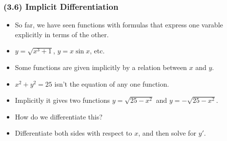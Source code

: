 \begin{frame}
\frametitle{(3.6) Implicit Differentiation}
\begin{itemize}
\item  So far, we have seen functions with formulas that express one varable explicitly in terms of the other.
\item<2->  $y = \sqrt{x^3+1}$, $y = x\sin x$, etc.
\item<3->  Some functions are given implicitly by a relation between $x$ and $y$.
\item<4->  $x^2 + y^2 = 25$ isn't the equation of any one function.
\item<5->  Implicitly it gives two functions $y = \sqrt{25-x^2}$ and $y = -\sqrt{25-x^2}$.
\item<6->  How do we differentiate this?
\item<7->  Differentiate both sides with respect to $x$, and then solve for $y'$.
\end{itemize}
\begin{center}
\ %
\ %
\ %
\end{center}
\end{frame}

